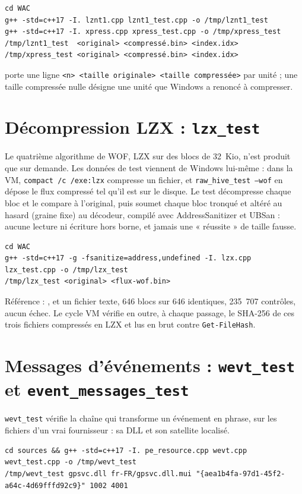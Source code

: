 \documentclass[11pt,a4paper,oneside]{report}
\begin{document}
\begin{lstlisting}
cd WAC
g++ -std=c++17 -I. lznt1.cpp lznt1_test.cpp -o /tmp/lznt1_test
g++ -std=c++17 -I. xpress.cpp xpress_test.cpp -o /tmp/xpress_test
/tmp/lznt1_test  <original> <compressé.bin> <index.idx>
/tmp/xpress_test <original> <compressé.bin> <index.idx>
\end{lstlisting}

 porte une ligne \texttt{<n> <taille originale> <taille
compressée>} par unité ; une taille compressée nulle désigne une unité que
Windows a renoncé à compresser.

\section{Décompression LZX : \texttt{lzx\_test}}

Le quatrième algorithme de WOF, LZX sur des blocs de 32~Kio, n'est produit que
sur demande. Les données de test viennent de Windows lui-même : dans la VM,
\texttt{compact /c /exe:lzx} compresse un fichier, et
\texttt{raw\_hive\_test --wof} en dépose le flux compressé tel qu'il est sur le
disque. Le test décompresse chaque bloc et le compare à l'original, puis soumet
chaque bloc tronqué et altéré au hasard (graine fixe) au décodeur, compilé avec
AddressSanitizer et UBSan : aucune lecture ni écriture hors borne, et jamais une
« réussite » de taille fausse.

\begin{lstlisting}
cd WAC
g++ -std=c++17 -g -fsanitize=address,undefined -I. lzx.cpp lzx_test.cpp -o /tmp/lzx_test
/tmp/lzx_test <original> <flux-wof.bin>
\end{lstlisting}

Référence : ,  et un fichier texte,
646 blocs sur 646 identiques, 235~707 contrôles, aucun échec. Le cycle VM
vérifie en outre, à chaque passage, le SHA-256 de ces trois fichiers compressés
en LZX et lus en brut contre \texttt{Get-FileHash}.

\section{Messages d'événements : \texttt{wevt\_test} et \texttt{event\_messages\_test}}

\texttt{wevt\_test} vérifie la chaîne qui transforme un événement en phrase,
sur les fichiers d'un vrai fournisseur : sa DLL et son satellite localisé.

\begin{lstlisting}
cd sources && g++ -std=c++17 -I. pe_resource.cpp wevt.cpp wevt_test.cpp -o /tmp/wevt_test
/tmp/wevt_test gpsvc.dll fr-FR/gpsvc.dll.mui "{aea1b4fa-97d1-45f2-a64c-4d69fffd92c9}" 1002 4001
\end{lstlisting}
\end{document}
